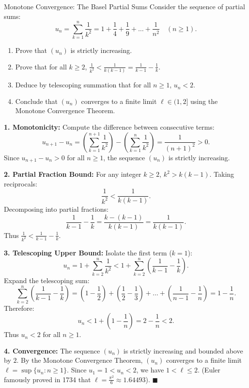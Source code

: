 \begin{exercise}{Monotone Convergence: The Basel Partial Sums}
Consider the sequence of partial sums:
\[
u_n = \sum_{k=1}^n \frac{1}{k^2} = 1 + \frac{1}{4} + \frac{1}{9} + \dots + \frac{1}{n^2} \quad (n \ge 1).
\]
\begin{enumerate}[leftmargin=1.5em,itemsep=2pt]
  \item Prove that $(u_n)$ is strictly increasing.
  \item Prove that for all $k \ge 2$, $\frac{1}{k^2} < \frac{1}{k(k - 1)} = \frac{1}{k - 1} - \frac{1}{k}$.
  \item Deduce by telescoping summation that for all $n \ge 1$, $u_n < 2$.
  \item Conclude that $(u_n)$ converges to a finite limit $\ell \in (1, 2]$ using the Monotone Convergence Theorem.
\end{enumerate}
\end{exercise}

\begin{tabletworkspace}[5.0cm]
\end{tabletworkspace}

\begin{solution}
\textbf{1. Monotonicity:}
Compute the difference between consecutive terms:
\[
u_{n+1} - u_n = \left(\sum_{k=1}^{n+1} \frac{1}{k^2}\right) - \left(\sum_{k=1}^n \frac{1}{k^2}\right) = \frac{1}{(n+1)^2} > 0.
\]
Since $u_{n+1} - u_n > 0$ for all $n \ge 1$, the sequence $(u_n)$ is strictly increasing.

\textbf{2. Partial Fraction Bound:}
For any integer $k \ge 2$, $k^2 > k(k - 1)$. Taking reciprocals:
\[
\frac{1}{k^2} < \frac{1}{k(k - 1)}.
\]
Decomposing into partial fractions:
\[
\frac{1}{k - 1} - \frac{1}{k} = \frac{k - (k - 1)}{k(k - 1)} = \frac{1}{k(k - 1)}.
\]
Thus $\frac{1}{k^2} < \frac{1}{k - 1} - \frac{1}{k}$.

\textbf{3. Telescoping Upper Bound:}
Isolate the first term ($k = 1$):
\[
u_n = 1 + \sum_{k=2}^n \frac{1}{k^2} < 1 + \sum_{k=2}^n \left( \frac{1}{k - 1} - \frac{1}{k} \right).
\]
Expand the telescoping sum:
\[
\sum_{k=2}^n \left( \frac{1}{k - 1} - \frac{1}{k} \right) = \left( 1 - \frac{1}{2} \right) + \left( \frac{1}{2} - \frac{1}{3} \right) + \dots + \left( \frac{1}{n - 1} - \frac{1}{n} \right) = 1 - \frac{1}{n}.
\]
Therefore:
\[
u_n < 1 + \left( 1 - \frac{1}{n} \right) = 2 - \frac{1}{n} < 2.
\]
Thus $u_n < 2$ for all $n \ge 1$.

\textbf{4. Convergence:}
The sequence $(u_n)$ is strictly increasing and bounded above by $2$.
By the Monotone Convergence Theorem, $(u_n)$ converges to a finite limit $\ell = \sup \{u_n : n \ge 1\}$.
Since $u_1 = 1 < u_n < 2$, we have $1 < \ell \le 2$.
(Euler famously proved in 1734 that $\ell = \frac{\pi^2}{6} \approx 1.64493$). \hfill $\blacksquare$
\end{solution}

